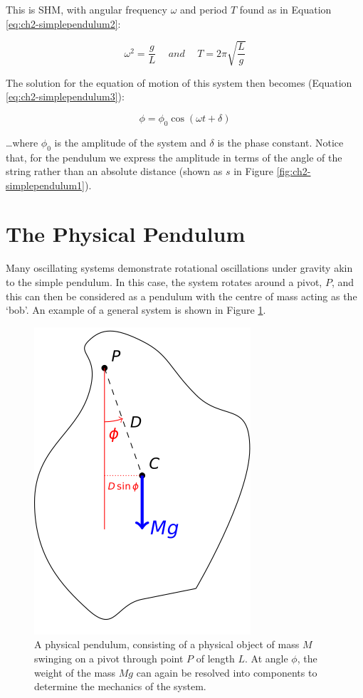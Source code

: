 \documentclass[
]{book}
\begin{document}
This is SHM, with angular frequency \(\omega\) and period \(T\) found as in Equation \eqref{eq:ch2-simplependulum2}:

\begin{equation}
\omega^2 = \frac{g}{L} \hspace{15pt} and \hspace{15pt} T = 2\pi \sqrt{\frac{L}{g}}
\label{eq:ch2-simplependulum2}
\end{equation}

The solution for the equation of motion of this system then becomes (Equation \eqref{eq:ch2-simplependulum3}):

\begin{equation}
\phi = \phi_0 \cos (\omega t + \delta)
\label{eq:ch2-simplependulum3}
\end{equation}

\ldots where \(\phi_0\) is the amplitude of the system and \(\delta\) is the phase constant. Notice that, for the pendulum we express the amplitude in terms of the angle of the string rather than an absolute distance (shown as \(s\) in Figure \ref{fig:ch2-simplependulum1}).

\hypertarget{sec:ch2-physicalpendulum}{%
\section{The Physical Pendulum}\label{sec:ch2-physicalpendulum}}

Many oscillating systems demonstrate rotational oscillations under gravity akin to the simple pendulum. In this case, the system rotates around a pivot, \(P\), and this can then be considered as a pendulum with the centre of mass acting as the `bob'. An example of a general system is shown in Figure \ref{fig:ch2-physicalpendulum1}.

\begin{figure}

{\centering \includegraphics[width=0.4\linewidth]{visualisations/LaTeX/ch2-physicalpendulum1} 

}

\caption{A physical pendulum, consisting of a physical object of mass $M$ swinging on a pivot through point $P$ of length $L$. At angle $\phi$, the weight of the mass $Mg$ can again be resolved into components to determine the mechanics of the system.}\label{fig:ch2-physicalpendulum1}
\end{figure}
\end{document}
